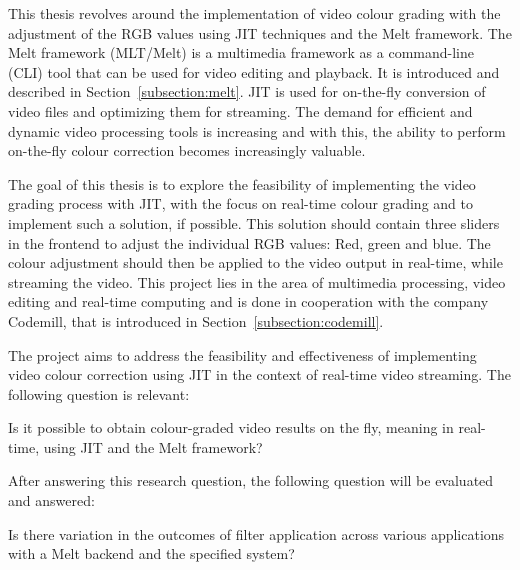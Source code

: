 \documentclass[../MasterThesis.tex]{subfiles}
\begin{document}
	
	This thesis revolves around the implementation of video colour grading with the adjustment of the RGB values using JIT techniques and the Melt framework. The Melt framework (MLT/Melt) is a multimedia framework as a command-line (CLI) tool that can be used for video editing and playback. It is introduced and described in Section~\ref{subsection:melt}.
	JIT is used for on-the-fly conversion of video files and optimizing them for streaming. 
	The demand for efficient and dynamic video processing tools is increasing and with this, the ability to perform on-the-fly colour correction becomes increasingly valuable. 
	
	
	The goal of this thesis is to explore the feasibility of implementing the video grading process with JIT, with the focus on real-time colour grading and to implement such a solution, if possible. This solution should contain three sliders in the frontend to adjust the individual RGB values: Red, green and blue. The colour adjustment should then be applied to the video output in real-time, while streaming the video.
	This project lies in the area of multimedia processing, video editing and real-time computing and is done in cooperation with the company Codemill, that is introduced in Section~\ref{subsection:codemill}.
	
	
	
	The project aims to address the feasibility and effectiveness of implementing video colour correction using JIT in the context of real-time video streaming. The following question is relevant:
	
	\begin{researchbox}
		Is it possible to obtain colour-graded video results on the fly, meaning in real-time, using JIT and the Melt framework?
	\end{researchbox}
	
	After answering this research question, the following question will be evaluated and answered:
	
	\begin{researchbox}
		Is there variation in the outcomes of filter application across various applications with a Melt backend and the specified system?
	\end{researchbox}
\end{document}
